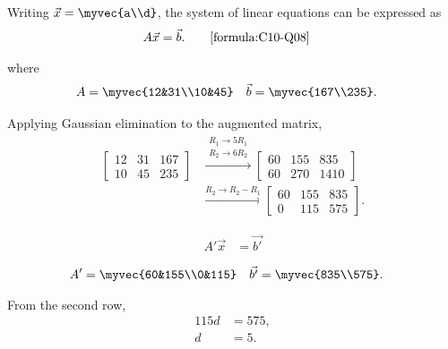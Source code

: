 \begin{enumerate}[label=\thesubsection.\arabic*, ref=\thesubsection.\theenumi]
	      Writing $\vec{x}=\myvec{a\\d}$, the system of linear equations can be expressed as
	      \begin{align*}
		      A\vec{x} & =\vec{b}.
		      \tag*{\eqref{formula:C10-Q08}}
	      \end{align*}

	      where
	      \begin{align*}
		      A &= \myvec{12&31\\10&45} &
		      \vec{b} &= \myvec{167\\235}.
	      \end{align*}

	      Applying Gaussian elimination to the augmented matrix,
	      \begin{align*}
		      \left[\begin{array}{cc|c}
			      12 & 31 & 167 \\
			      10 & 45 & 235
		      \end{array}\right]
		      &\xrightarrow{\substack{R_1\rightarrow5R_1\\R_2\rightarrow6R_2}}
		      \left[\begin{array}{cc|c}
			      60 & 155 & 835 \\
			      60 & 270 & 1410
		      \end{array}\right] \\[6pt]
		      &\xrightarrow{R_2\rightarrow R_2-R_1}
		      \left[\begin{array}{cc|c}
			      60 & 155 & 835 \\
			      0 & 115 & 575
		      \end{array}\right].
	      \end{align*}

	      \begin{align*}
		      A'\vec{x} & =\vec{b'}
	      \end{align*}
	      
	       \begin{align*}
		      A' &= \myvec{60&155\\0&115} &
		       \vec{b'} &= \myvec{835\\575}.
	      \end{align*}

	      From the second row,
	      \begin{align*}
		      115d &=575,\\
		      d &=5.
	      \end{align*}


\end{enumerate}
